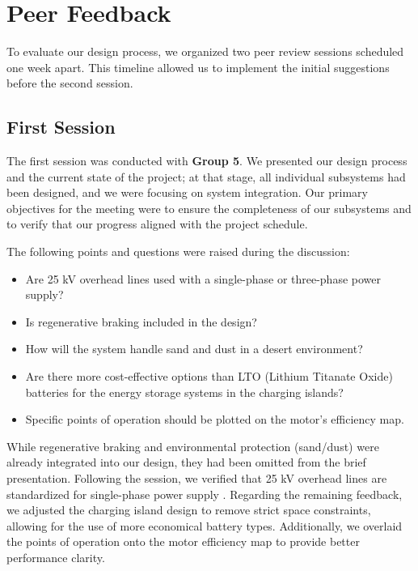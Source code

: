 \section{Peer Feedback}


To evaluate our design process, we organized two peer review sessions scheduled one week apart. This timeline allowed us to implement the initial suggestions before the second session.

\subsection{First Session}
The first session was conducted with \textbf{Group 5}. We presented our design process and the current state of the project; at that stage, all individual subsystems had been designed, and we were focusing on system integration. Our primary objectives for the meeting were to ensure the completeness of our subsystems and to verify that our progress aligned with the project schedule.

The following points and questions were raised during the discussion:

\begin{itemize}
\item Are 25 kV overhead lines used with a single-phase or three-phase power supply?
\item Is regenerative braking included in the design?
\item How will the system handle sand and dust in a desert environment?
\item Are there more cost-effective options than LTO (Lithium Titanate Oxide) batteries for the energy storage systems in the charging islands?
\item Specific points of operation should be plotted on the motor's efficiency map.
\end{itemize}

While regenerative braking and environmental protection (sand/dust) were already integrated into our design, they had been omitted from the brief presentation. Following the session, we verified that 25 kV overhead lines are standardized for single-phase power supply \cite{inproceedings}. Regarding the remaining feedback, we adjusted the charging island design to remove strict space constraints, allowing for the use of more economical battery types. Additionally, we overlaid the points of operation onto the motor efficiency map to provide better performance clarity.

